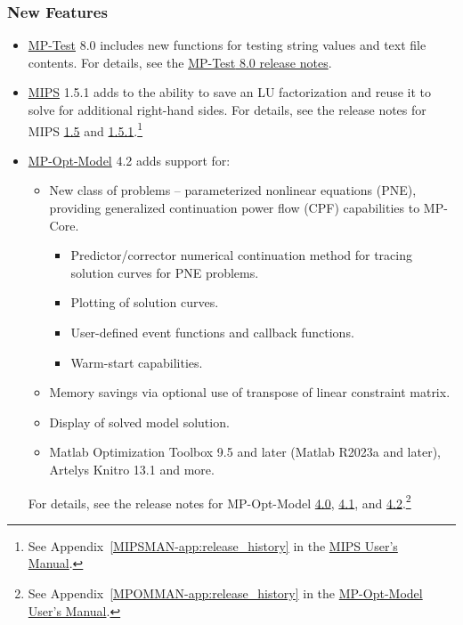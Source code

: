 \documentclass[12pt]{article}
\newcommand{\matlab}[0]{{\sc Matlab}}
\newcommand{\mptest}[0]{{MP-Test}}
\newcommand{\mptesturl}[0]{https://github.com/MATPOWER/mptest}
\newcommand{\mptestlink}[0]{\href{\mptesturl}{\mptest{}}}
\newcommand{\mips}[0]{{MIPS}}
\newcommand{\mipsurl}[0]{https://github.com/MATPOWER/mips}
\newcommand{\mipslink}[0]{\href{\mipsurl}{\mips{}}}
\newcommand{\mipsver}[0]{1.5.1}
\newcommand{\mpom}[0]{\mbox{MP-Opt-Model}}
\newcommand{\mpomurl}[0]{https://github.com/MATPOWER/mp-opt-model}
\newcommand{\mpomlink}[0]{\href{\mpomurl}{\mpom{}}}
\newcommand{\mpomver}[0]{4.2}
\newcommand{\mpcore}{{MP-Core}}
\newcommand{\code}[1]{{\relsize{-0.5}{\tt{{#1}}}}}  %
\newcommand{\mipsmanurl}[0]{https://matpower.org/docs/MIPS-manual-\mipsver.pdf}
\newcommand{\mpommanurl}[0]{https://matpower.org/docs/MP-Opt-Model-manual-\mpomver.pdf}
\newcommand{\mipsman}[0]{\href{\mipsmanurl}{\mips{} User's Manual}}
\newcommand{\mpomman}[0]{\href{\mpommanurl}{\mpom{} User's Manual}}
\numberwithin{equation}{section}
\numberwithin{table}{section}
\numberwithin{figure}{section}
\begin{document}
\begin{appendices}
\subsubsection*{New Features}
\begin{itemize}
\item \mptestlink{} 8.0 includes new functions for testing string values and text file contents. For details, see the \href{\mptesturl/blob/master/docs/relnotes/MP-Test-Release-Notes-8.0.md}{\mptest{} 8.0 release notes}.
\item \mipslink{} 1.5.1 adds to \code{mplinsolve()} the ability to save an LU factorization and reuse it to solve for additional right-hand sides. For details, see the release notes for \mips{} \href{\mipsurl/blob/master/docs/relnotes/MIPS-Release-Notes-1.5.md}{1.5} and \href{\mipsurl/blob/master/docs/relnotes/MIPS-Release-Notes-1.5.1.md}{1.5.1}.\footnote{See Appendix~\ref{MIPSMAN-app:release_history} in the \mipsman{}.}
\item \mpomlink{} 4.2 adds support for:
  \begin{itemize}
    \item New class of problems -- parameterized nonlinear equations (PNE), providing generalized continuation power flow (CPF) capabilities to \mpcore{}.
      \begin{itemize}
      \item Predictor/corrector numerical continuation method for tracing solution curves for PNE problems.
      \item Plotting of solution curves.
      \item User-defined event functions and callback functions.
      \item Warm-start capabilities.
      \end{itemize}
    \item Memory savings via optional use of transpose of linear constraint matrix.
    \item Display of solved model solution.
    \item \matlab{} Optimization Toolbox 9.5 and later (\matlab{} R2023a and later), Artelys Knitro 13.1 and more.
  \end{itemize}
 For details, see the release notes for \mpom{}  \href{\mpomurl/blob/master/docs/relnotes/MP-Opt-Model-Release-Notes-4.0.md}{4.0}, \href{\mpomurl/blob/master/docs/relnotes/MP-Opt-Model-Release-Notes-4.1.md}{4.1}, and \href{\mpomurl/blob/master/docs/relnotes/MP-Opt-Model-Release-Notes-4.2.md}{4.2}.\footnote{See Appendix~\ref{MPOMMAN-app:release_history} in the \mpomman{}.}

\end{itemize}
\end{appendices}
\end{document}
